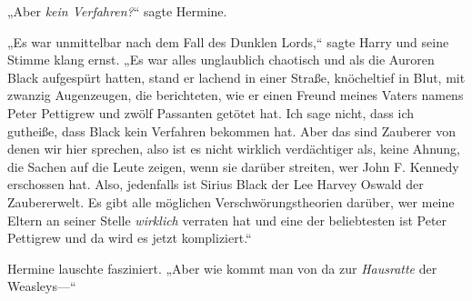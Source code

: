 „Aber \emph{kein Verfahren?}“ sagte Hermine.

„Es war unmittelbar nach dem Fall des Dunklen Lords,“ sagte Harry und seine Stimme klang ernst. „Es war alles unglaublich chaotisch und als die Auroren Black aufgespürt hatten, stand er lachend in einer Straße, knöcheltief in Blut, mit zwanzig Augenzeugen, die berichteten, wie er einen Freund meines Vaters namens Peter Pettigrew und zwölf Passanten getötet hat. Ich sage nicht, dass ich gutheiße, dass Black kein Verfahren bekommen hat. Aber das sind Zauberer von denen wir hier sprechen, also ist es nicht wirklich verdächtiger als, keine Ahnung, die Sachen auf die Leute zeigen, wenn sie darüber streiten, wer John F. Kennedy erschossen hat. Also, jedenfalls ist Sirius Black der Lee Harvey Oswald der Zaubererwelt. Es gibt alle möglichen Verschwörungstheorien darüber, wer meine Eltern an seiner Stelle \emph{wirklich} verraten hat und eine der beliebtesten ist Peter Pettigrew und da wird es jetzt kompliziert.“

Hermine lauschte fasziniert. „Aber wie kommt man von da zur \emph{Hausratte} der Weasleys—“

